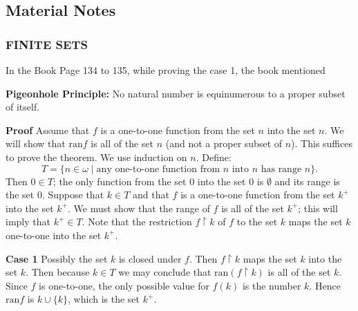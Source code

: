 \subsection{Material Notes}
\subsubsection{FINITE SETS}
In the Book Page 134 to 135, while proving the case 1, the book mentioned

\begin{leftbar}
    \textbf{Pigeonhole Principle:} No natural number is equinumerous to a proper subset of itself.

    \textbf{Proof} Assume that \(f\) is a one-to-one function from the set \(n\) into the set \(n\). We will show that \(\text{ran} f\) is all of the set \(n\) (and not a proper subset of \(n\)). This suffices to prove the theorem.
    We use induction on \(n\). Define:
    \[
    T = \{ n \in \omega \mid \text{any one-to-one function from } n \text{ into } n \text{ has range } n \}.
    \]
    Then \(0 \in T\); the only function from the set \(0\) into the set \(0\) is \(\emptyset\) and its range is the set \(0\). Suppose that \(k \in T\) and that \(f\) is a one-to-one function from the set \(k^+\) into the set \(k^+\). We must show that the range of \(f\) is all of the set \(k^+\); this will imply that \(k^+ \in T\). Note that the restriction \(f \upharpoonright k\) of \(f\) to the set \(k\) maps the set \(k\) one-to-one into the set \(k^+\).

    \textbf{Case 1} Possibly the set \(k\) is closed under \(f\). Then \(f \upharpoonright k\) maps the set \(k\) into the set \(k\). Then because \(k \in T\) we may conclude that \(\text{ran} (f \upharpoonright k)\) is all of the set \(k\). Since \(f\) is one-to-one, the only possible value for \(f(k)\) is the number \(k\). Hence \(\text{ran} f\) is \(k \cup \{k\}\), which is the set \(k^+\).  
\end{leftbar}
